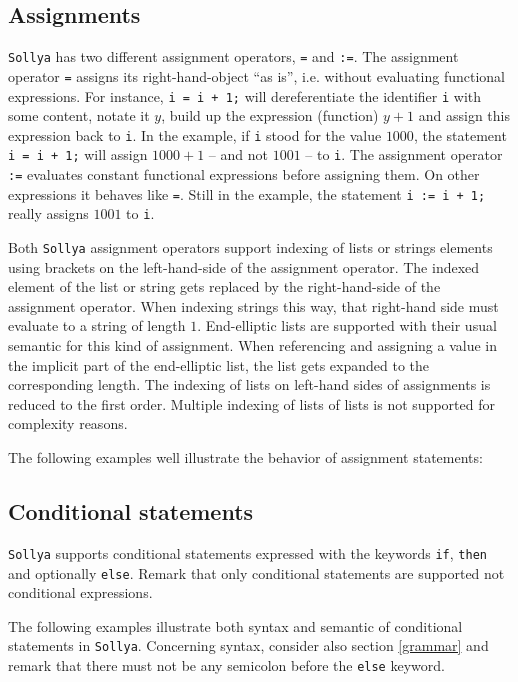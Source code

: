 \documentclass[a4paper]{article}
\newcommand{\key}[1]{\texttt{#1}}
\newcommand{\sollya}{\texttt{Sollya}\xspace}
\begin{document}
\subsection{Assignments}

\sollya has two different assignment operators, \texttt{=} and
\texttt{:=}. The assignment operator \texttt{=} assigns its
right-hand-object ``as is'', i.e. without evaluating functional
expressions. For instance, \texttt{i = i + 1;} will dereferentiate the
identifier \texttt{i} with some content, notate it $y$, build up the
expression (function) $y + 1$ and assign this expression back to
\texttt{i}. In the example, if \texttt{i} stood for the value $1000$,
the statement \texttt{i = i + 1;} will assign $1000 + 1$ -- and not
$1001$ -- to \texttt{i}. The assignment operator \texttt{:=} evaluates
constant functional expressions before assigning them. On other
expressions it behaves like \texttt{=}. Still in the example, the
statement \texttt{i := i + 1;} really assigns $1001$ to \texttt{i}.

Both \sollya assignment operators support indexing of lists or strings
elements using brackets on the left-hand-side of the assignment
operator. The indexed element of the list or string gets replaced by
the right-hand-side of the assignment operator.  When indexing strings
this way, that right-hand side must evaluate to a string of length
$1$. End-elliptic lists are supported with their usual semantic for
this kind of assignment.  When referencing and assigning a value in
the implicit part of the end-elliptic list, the list gets expanded to
the corresponding length. The indexing of lists on left-hand sides of
assignments is reduced to the first order. Multiple indexing of lists
of lists is not supported for complexity reasons. 

The following examples well illustrate the behavior of assignment
statements:



\subsection{Conditional statements}

\sollya supports conditional statements expressed with the keywords
\key{if}, \key{then} and optionally \key{else}. Remark that only
conditional statements are supported not conditional expressions. 

The following examples illustrate both syntax and semantic of
conditional statements in \sollya. Concerning syntax, consider also
section \ref{grammar} and remark that there must not be any semicolon
before the \key{else} keyword.
\end{document}
